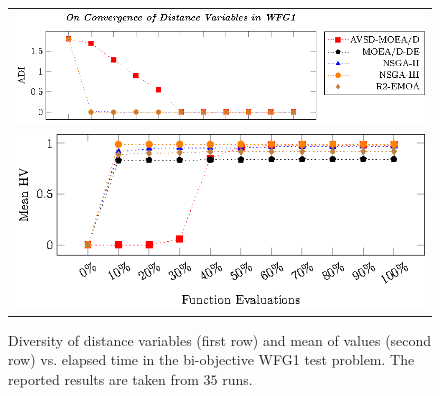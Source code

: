 \begin{figure}[t]
\centering
\begin{tabular}{l}
 \includegraphics[scale=0.75]{images/Diversity_Long_Term_tikz_WFG1-figure0.eps}\\[0cm]%
 \includegraphics[scale=0.75]{images/Diversity_Long_Term_tikz_WFG1-figure1.eps}\\[0cm]%
\end{tabular}
\caption{Diversity of distance variables (first row) and mean of \HV{} values (second row) vs. elapsed time in the bi-objective WFG1 test problem. The reported results are taken from $35$ runs.}\label{fig:WFG1_Diversity}
\end{figure}


